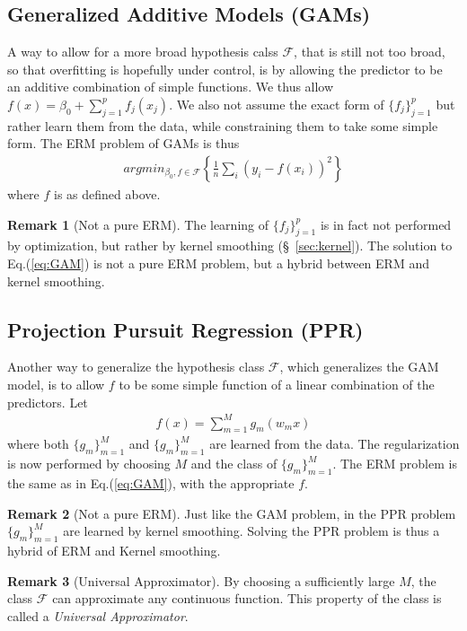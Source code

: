 \documentclass[12pt,a4paper]{article}
\theoremstyle{plain}
\theoremstyle{definition}
\newtheorem{remark}{Remark}
\newcommand{\argmin}[2]{argmin_{#1}\left\{ #2 \right\}}
\newcommand{\hyp}{f}
\newcommand{\hypclass}{\mathcal{F}}
\begin{document}
\subsection{Generalized Additive Models (GAMs)}
\label{sec:gam}
A way to allow for a more broad hypothesis calss $\hypclass$, that is still not too broad, so that overfitting is hopefully under control, is by allowing the predictor to be an additive combination of simple functions.
We thus allow $\hyp(x)=\beta_0 + \sum_{j=1}^p f_j(x_j)$. We also not assume the exact form of $\{f_j\}_{j=1}^p$ but rather learn them from the data, while constraining them to take some simple form.
The ERM problem of GAMs is thus
\begin{align}
\label{eq:GAM}
	 \argmin{\beta_0,\hyp \in \hypclass}{\frac{1}{n}\sum_i (y_i-\hyp(x_i))^2  }
\end{align}
where $\hyp$ is as defined above.

\begin{remark}[Not a pure ERM]
The learning of $\{f_j\}_{j=1}^p$ is in fact not performed by optimization, but rather by kernel smoothing (\S~\ref{sec:kernel}).
The solution to Eq.(\ref{eq:GAM}) is not a pure ERM problem, but a hybrid between ERM and kernel smoothing.
\end{remark}



\subsection{Projection Pursuit Regression (PPR)}
\label{sec:ppr}
Another way to generalize the hypothesis class $\hypclass$, which generalizes the GAM model, is to allow $\hyp$ to be some simple function of a linear combination of the predictors. Let 
\begin{align}
\label{eq:PPR}
	\hyp(x)=\sum_{m=1}^M g_m(w_m x)
\end{align}
where both $\{g_m\}_{m=1}^M$ and $\{g_m\}_{m=1}^M$ are learned from the data. 
The regularization is now performed by choosing $M$ and the class of $\{g_m\}_{m=1}^M$.
The ERM problem is the same as in Eq.(\ref{eq:GAM}), with the appropriate $\hyp$.

\begin{remark}[Not a pure ERM]
Just like the GAM problem, in the PPR problem $\{g_m\}_{m=1}^M$ are learned by kernel smoothing. Solving the PPR problem is thus a hybrid of ERM and Kernel smoothing. 
\end{remark}

\begin{remark}[Universal Approximator]
By choosing a sufficiently large $M$, the class $\hypclass$ can approximate any continuous function. This property of the class is called a \emph{Universal Approximator}.
\end{remark}
\end{document}
